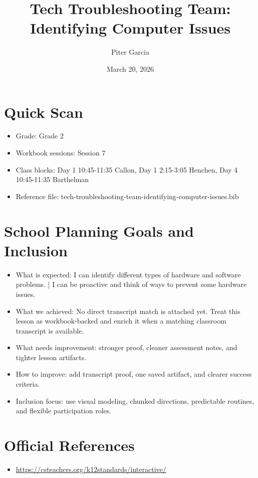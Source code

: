 \documentclass[11pt]{article}
\title{Tech Troubleshooting Team: Identifying Computer Issues}
\author{Piter Garcia}
\date{March 20, 2026}
\begin{document}
\maketitle
\section*{Quick Scan}
\begin{itemize}[leftmargin=*]
\item Grade: Grade 2
\item Workbook sessions: Session 7
\item Class blocks: Day 1 10:45-11:35 Callon, Day 1 2:15-3:05 Henchen, Day 4 10:45-11:35 Barthelman
\item Reference file: tech-troubleshooting-team-identifying-computer-issues.bib
\end{itemize}
\section*{School Planning Goals and Inclusion}
\begin{itemize}[leftmargin=*]
\item What is expected: I can identify different types of hardware and software problems. | I can be proactive and think of ways to prevent some hardware issues.
\item What we achieved: No direct transcript match is attached yet. Treat this lesson as workbook-backed and enrich it when a matching classroom transcript is available.
\item What needs improvement: stronger proof, cleaner assessment notes, and tighter lesson artifacts.
\item How to improve: add transcript proof, one saved artifact, and clearer success criteria.
\item Inclusion focus: use visual modeling, chunked directions, predictable routines, and flexible participation roles.
\end{itemize}
\section*{Official References}
\begin{itemize}[leftmargin=*]
\item \url{https://csteachers.org/k12standards/interactive/}

\end{itemize}
\end{document}
